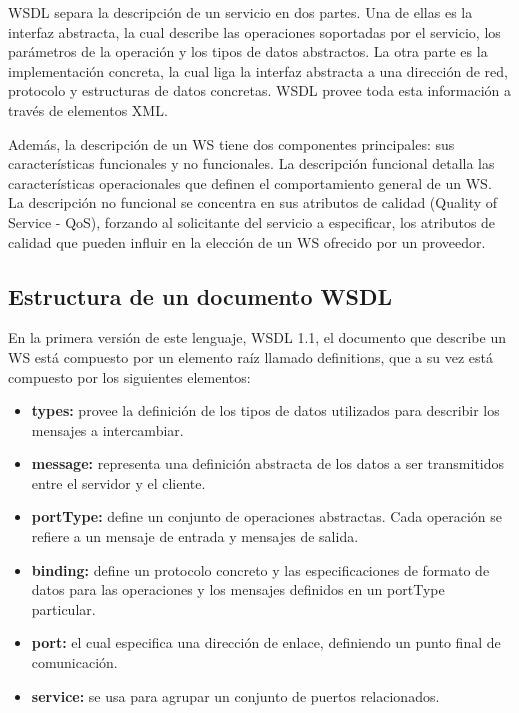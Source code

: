 WSDL separa la descripción de un servicio en dos partes. Una de ellas es la interfaz abstracta, la cual describe las operaciones soportadas por el servicio, los parámetros de la operación y los tipos de datos abstractos. La otra parte es la implementación concreta, la cual liga la interfaz abstracta a una dirección de red, protocolo y estructuras de datos concretas. WSDL provee toda esta información a través de elementos XML. 

Además, la descripción de un WS tiene dos componentes principales: sus características funcionales y no funcionales. La descripción funcional detalla las características operacionales que definen el comportamiento general de un WS. La descripción no funcional se concentra en sus atributos de calidad (Quality of Service - QoS), forzando al solicitante del servicio a especificar, los atributos de calidad que pueden influir en la elección de un WS ofrecido por un proveedor.

\subsection{Estructura de un documento WSDL}

En la primera versión de este lenguaje, WSDL 1.1, el documento que describe un WS está compuesto por un elemento raíz llamado definitions, que a su vez está compuesto por los siguientes elementos:

\begin{itemize}
	\item \textbf{types:} provee la definición de los tipos de datos utilizados para describir los mensajes a intercambiar.
	\item \textbf{message:} representa una definición abstracta de los datos a ser transmitidos entre el servidor y el cliente.
	\item \textbf{portType:} define un conjunto de operaciones abstractas. Cada operación se refiere a un mensaje de entrada y mensajes de salida.
	\item \textbf{binding:} define un protocolo concreto y las especificaciones de formato de datos para las operaciones y los mensajes definidos en un portType particular.
	\item \textbf{port:} el cual especifica una dirección de enlace, definiendo un punto final de comunicación.
	\item \textbf{service:} se usa para agrupar un conjunto de puertos relacionados.
\end{itemize}


